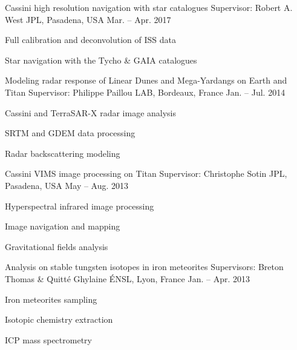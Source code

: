 
\begin{cventries}

  \cventry
    {Cassini high resolution navigation with star catalogues}
    {Supervisor: Robert A. West}
    {JPL, Pasadena, USA}
    {Mar. -- Apr. 2017}
    {
      \begin{cvitems}
        \item{Full calibration and deconvolution of ISS data}
        \item{Star navigation with the Tycho \& GAIA catalogues}
      \end{cvitems}
    }

  \cventry
    {Modeling radar response of Linear Dunes and Mega-Yardangs on Earth and Titan}
    {Supervisor: Philippe Paillou}
    {LAB, Bordeaux, France}
    {Jan. -- Jul. 2014}
    {
      \begin{cvitems}
        \item{Cassini and TerraSAR-X radar image analysis}
        \item{SRTM and GDEM data processing}
        \item{Radar backscattering modeling}
      \end{cvitems}
    }

  \cventry
    {Cassini VIMS image processing on Titan}
    {Supervisor: Christophe Sotin}
    {JPL, Pasadena, USA}
    {May -- Aug. 2013}
    {
      \begin{cvitems}
        \item{Hyperspectral infrared image processing}
        \item{Image navigation and mapping}
        \item{Gravitational fields analysis}
      \end{cvitems}
    }

  \cventry
    {Analysis on stable tungsten isotopes in iron meteorites}
    {Supervisors: Breton Thomas \& Quitté Ghylaine}
    {ÉNSL, Lyon, France}
    {Jan. -- Apr. 2013}
    {
      \begin{cvitems}
        \item{Iron meteorites sampling}
        \item{Isotopic chemistry extraction}
        \item{ICP mass spectrometry}
      \end{cvitems}
    }



\end{cventries}

